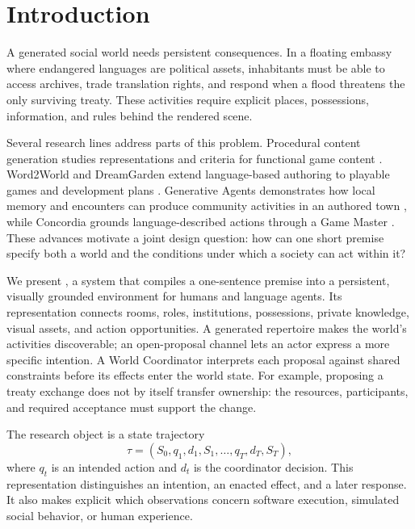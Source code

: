 \section{Introduction}
\label{sec:intro}

A generated social world needs persistent consequences. In a floating embassy
where endangered languages are political assets, inhabitants must be able to
access archives, trade translation rights, and respond when a flood threatens
the only surviving treaty. These activities require explicit places,
possessions, information, and rules behind the rendered scene.

Several research lines address parts of this problem. Procedural content
generation studies representations and criteria for functional game content
\cite{togelius2011,pcgml}. Word2World and DreamGarden extend language-based
authoring to playable games and development plans \cite{word2world,dreamgarden}.
Generative Agents demonstrates how local memory and encounters can produce
community activities in an authored town \cite{park2023}, while Concordia
grounds language-described actions through a Game Master \cite{vezhnevets2023}.
These advances motivate a joint design question: how can one short premise
specify both a world and the conditions under which a society can act within it?

We present \agora, a system that compiles a one-sentence premise into a
persistent, visually grounded environment for humans and language agents.
Its representation connects rooms, roles, institutions, possessions, private
knowledge, visual assets, and action opportunities. A generated repertoire
makes the world's activities discoverable; an open-proposal channel lets an
actor express a more specific intention. A World Coordinator interprets each
proposal against shared constraints before its effects enter the world state.
For example, proposing a treaty exchange does not by itself transfer ownership:
the resources, participants, and required acceptance must support the change.

The research object is a state trajectory
\begin{equation}
\tau=(S_0,q_1,d_1,S_1,\ldots,q_T,d_T,S_T),
\end{equation}
where $q_t$ is an intended action and $d_t$ is the coordinator decision.
This representation distinguishes an intention, an enacted effect, and a
later response. It also makes explicit which observations concern software
execution, simulated social behavior, or human experience.

